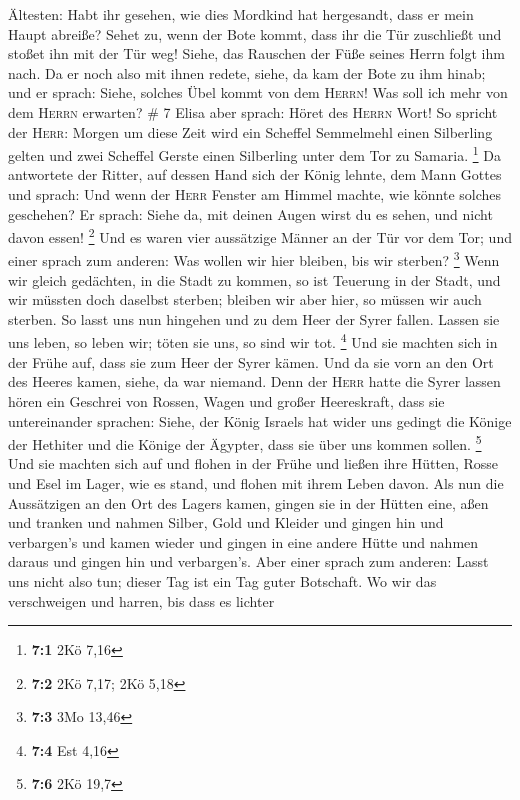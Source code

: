 Ältesten: Habt ihr gesehen, wie dies Mordkind hat hergesandt, dass er
mein Haupt abreiße? Sehet zu, wenn der Bote kommt, dass ihr die Tür
zuschließt und stoßet ihn mit der Tür weg! Siehe, das Rauschen der Füße
seines Herrn folgt ihm nach.  Da er noch also mit ihnen
redete, siehe, da kam der Bote zu ihm hinab; und er sprach: Siehe,
solches Übel kommt von dem \textsc{Herrn}! Was soll ich mehr von dem
\textsc{Herrn} erwarten? \# 7  Elisa aber sprach: Höret
des \textsc{Herrn} Wort! So spricht der \textsc{Herr}: Morgen um diese
Zeit wird ein Scheffel Semmelmehl einen Silberling gelten und zwei
Scheffel Gerste einen Silberling unter dem Tor zu Samaria. \footnote{\textbf{7:1}
  2Kö 7,16}  Da antwortete der Ritter, auf dessen Hand
sich der König lehnte, dem Mann Gottes und sprach: Und wenn der
\textsc{Herr} Fenster am Himmel machte, wie könnte solches geschehen? Er
sprach: Siehe da, mit deinen Augen wirst du es sehen, und nicht davon
essen! \footnote{\textbf{7:2} 2Kö 7,17; 2Kö 5,18}  Und es
waren vier aussätzige Männer an der Tür vor dem Tor; und einer sprach
zum anderen: Was wollen wir hier bleiben, bis wir sterben? \footnote{\textbf{7:3}
  3Mo 13,46}  Wenn wir gleich gedächten, in die Stadt zu
kommen, so ist Teuerung in der Stadt, und wir müssten doch daselbst
sterben; bleiben wir aber hier, so müssen wir auch sterben. So lasst uns
nun hingehen und zu dem Heer der Syrer fallen. Lassen sie uns leben, so
leben wir; töten sie uns, so sind wir tot. \footnote{\textbf{7:4} Est
  4,16}  Und sie machten sich in der Frühe auf, dass sie
zum Heer der Syrer kämen. Und da sie vorn an den Ort des Heeres kamen,
siehe, da war niemand.  Denn der \textsc{Herr} hatte die
Syrer lassen hören ein Geschrei von Rossen, Wagen und großer
Heereskraft, dass sie untereinander sprachen: Siehe, der König Israels
hat wider uns gedingt die Könige der Hethiter und die Könige der
Ägypter, dass sie über uns kommen sollen. \footnote{\textbf{7:6} 2Kö
  19,7}  Und sie machten sich auf und flohen in der Frühe
und ließen ihre Hütten, Rosse und Esel im Lager, wie es stand, und
flohen mit ihrem Leben davon.  Als nun die Aussätzigen an
den Ort des Lagers kamen, gingen sie in der Hütten eine, aßen und
tranken und nahmen Silber, Gold und Kleider und gingen hin und
verbargen's und kamen wieder und gingen in eine andere Hütte und nahmen
daraus und gingen hin und verbargen's.  Aber einer sprach
zum anderen: Lasst uns nicht also tun; dieser Tag ist ein Tag guter
Botschaft. Wo wir das verschweigen und harren, bis dass es lichter
